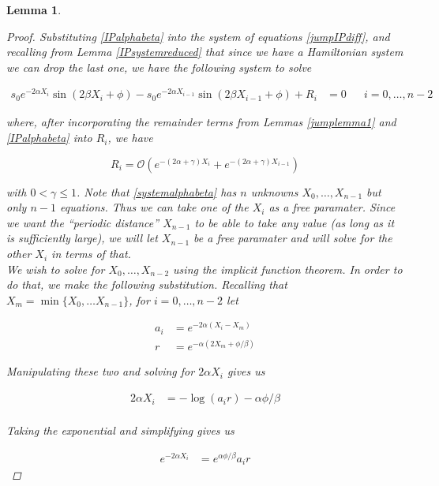 \documentclass[12pt]{article}
\newtheorem{lemma}{Lemma}
\begin{document}
\begin{lemma}

\begin{proof}
Substituting \eqref{IPalphabeta} into the system of equations \eqref{jumpIPdiff}, and recalling from Lemma \ref{IPsystemreduced} that since we have a Hamiltonian system we can drop the last one, we have the following system to solve

\begin{align}\label{systemalphabeta}
s_0 e^{-2 \alpha X_i} \sin(2 \beta X_i + \phi) - s_0 e^{-2 \alpha X_{i-1}} \sin(2 \beta X_{i-1} + \phi) + R_i &= 0 && i = 0, \dots, n-2
\end{align}

where, after incorporating the remainder terms from Lemmas \ref{jumplemma1} and \ref{IPalphabeta} into $R_i$, we have

\begin{equation}
R_i = \mathcal{O}(e^{-(2 \alpha + \gamma) X_i} + e^{-(2 \alpha + \gamma) X_{i-1}})
\end{equation}

with $0 < \gamma \leq 1$. Note that \eqref{systemalphabeta} has $n$ unknowns $X_0, \dots, X_{n-1}$ but only $n-1$ equations. Thus we can take one of the $X_i$ as a free paramater. Since we want the ``periodic distance'' $X_{n-1}$ to be able to take any value (as long as it is sufficiently large), we will let $X_{n-1}$ be a free paramater and will solve for the other $X_i$ in terms of that.\\

We wish to solve for $X_0, \dots, X_{n-2}$ using the implicit function theorem. In order to do that, we make the following substitution. Recalling that $X_m = \min \{X_0, \dots X_{n-1} \}$, for $i = 0, \dots, n-2$ let

\begin{align}
a_i &= e^{-2 \alpha (X_i - X_m)} \\
r &= e^{-\alpha( 2 X_m + \phi / \beta ) }
\end{align}

Manipulating these two and solving for $2 \alpha X_i$ gives us

\begin{align*}
2 \alpha X_i &= -\log (a_i r) - \alpha \phi / \beta \\
\end{align*}

Taking the exponential and simplifying gives us

\begin{align*}
e^{-2 \alpha X_i} &= e^{\alpha \phi / \beta } a_i r
\end{align*}


\end{proof}
\end{lemma}
\end{document}
